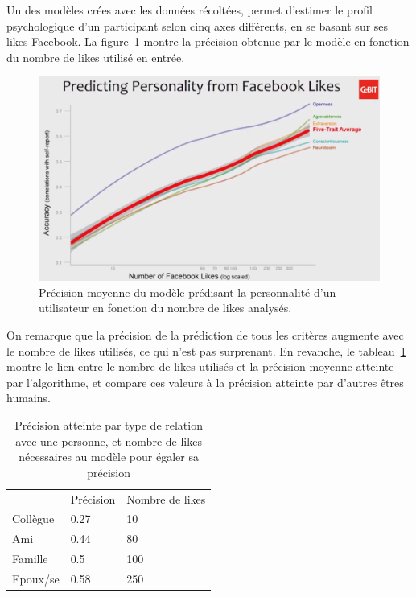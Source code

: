 			Un des modèles crées avec les données récoltées, permet d'estimer le profil psychologique d'un participant selon cinq axes différents, en se basant sur ses likes Facebook. La figure~\ref{a-talk1} montre la précision obtenue par le modèle en fonction du nombre de likes utilisé en entrée.

			\begin{figure}[ht]
				\centering
				\includegraphics[width=1\textwidth]{images/analysis/talk1}
				\caption{Précision moyenne du modèle prédisant la personnalité d'un utilisateur en fonction du nombre de likes analysés\cite{kosinski-talk}.}
				\label{a-talk1}
			\end{figure}

			On remarque que la précision de la prédiction de tous les critères augmente avec le nombre de likes utilisés, ce qui n'est pas surprenant. En revanche, le tableau~\ref{a-talk-table1} montre le lien entre le nombre de likes utilisés et la précision moyenne atteinte par l'algorithme, et compare ces valeurs à la précision atteinte par d'autres êtres humains.

			\begin{table}[]
				\centering
				\begin{tabular}{lll}
					         & Précision & Nombre de likes \\
					Collègue & 0.27      & 10                            \\
					Ami      & 0.44      & 80                            \\
					Famille  & 0.5       & 100                           \\
					Epoux/se & 0.58      & 250                          
				\end{tabular}
				\caption{Précision atteinte par type de relation avec une personne, et nombre de likes nécessaires au modèle pour égaler sa précision}
				\label{a-talk-table1}
			\end{table}


